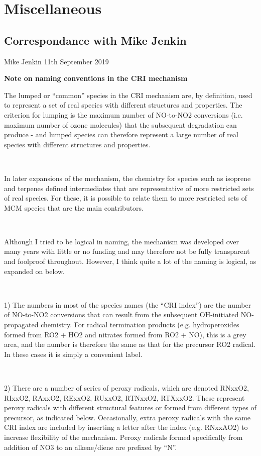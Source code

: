 \chapter{Miscellaneous}

\section{Correspondance with Mike Jenkin}\label{appendix:correspondance}
Mike Jenkin 11th September 2019

\textbf{Note on naming conventions in the CRI mechanism}\\

{\selectfont \parbox{\textwidth}{
The lumped or “common” species in the CRI mechanism are, by definition, used to represent a set of real species with different structures and properties. The criterion for lumping is the maximum number of NO-to-NO2 conversions (i.e. maximum number of ozone molecules) that the subsequent degradation can produce - and lumped species can therefore represent a large number of real species with different structures and properties.
\\}\\ \parbox{\textwidth}{
In later expansions of the mechanism, the chemistry for species such as isoprene and terpenes defined intermediates that are representative of more restricted sets of real species. For these, it is possible to relate them to more restricted sets of MCM species that are the main contributors.
\\}\\ \parbox{\textwidth}{
Although I tried to be logical in naming, the mechanism was developed over many years with little or no funding and may therefore not be fully transparent and foolproof throughout. However, I think quite a lot of the naming is logical, as expanded on below.
\\}\\ \parbox{\textwidth}{
1) The numbers in most of the species names (the “CRI index”) are the number of NO-to-NO2 conversions that can result from the subsequent OH-initiated NO-propagated chemistry. For radical termination products (e.g. hydroperoxides formed from RO2 + HO2 and nitrates formed from RO2 + NO), this is a grey area, and the number is therefore the same as that for the precursor RO2 radical. In these cases it is simply a convenient label.
\\}\\ \parbox{\textwidth}{
2) There are a number of series of peroxy radicals, which are denoted RNxxO2, RIxxO2, RAxxO2, RExxO2, RUxxO2, RTNxxO2, RTXxxO2. These represent peroxy radicals with different structural features or formed from different types of precursor, as indicated below. Occasionally, extra peroxy radicals with the same CRI index are included by inserting a letter after the index (e.g. RNxxAO2) to increase flexibility of the mechanism. Peroxy radicals formed specifically from addition of NO3 to an alkene/diene are prefixed by “N”.
}}
